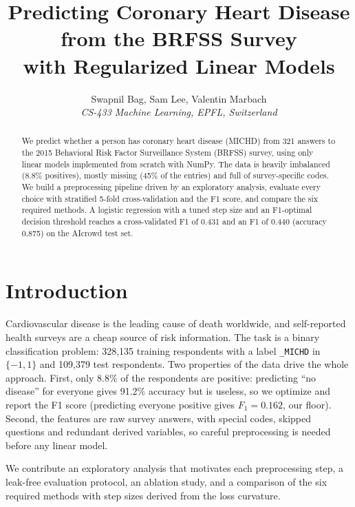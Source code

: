\documentclass[10pt,conference,compsocconf]{IEEEtran}
\begin{document}
\title{Predicting Coronary Heart Disease from the BRFSS Survey\\with Regularized Linear Models}

\author{
  Swapnil Bag, Sam Lee, Valentin Marbach\\
  \textit{CS-433 Machine Learning, EPFL, Switzerland}
}

\maketitle

\begin{abstract}
We predict whether a person has coronary heart disease (MICHD) from 321
answers to the 2015 Behavioral Risk Factor Surveillance System (BRFSS) survey,
using only linear models implemented from scratch with NumPy. The data is
heavily imbalanced (8.8\% positives), mostly missing (45\% of the entries) and
full of survey-specific codes. We build a preprocessing pipeline driven by an
exploratory analysis, evaluate every choice with stratified 5-fold
cross-validation and the F1 score, and compare the six required methods. A
logistic regression with a tuned step size and an F1-optimal decision
threshold reaches a cross-validated F1 of 0.431 and an F1 of 0.440 (accuracy
0.875) on the AIcrowd test set.
\end{abstract}

\section{Introduction}

Cardiovascular disease is the leading cause of death worldwide, and
self-reported health surveys are a cheap source of risk information. The task
is a binary classification problem: 328{,}135 training respondents with a
label \texttt{\_MICHD} in $\{-1,1\}$ and 109{,}379 test respondents. Two
properties of the data drive the whole approach. First, only 8.8\% of the
respondents are positive: predicting ``no disease'' for everyone gives 91.2\%
accuracy but is useless, so we optimize and report the F1 score (predicting
everyone positive gives $F_1 = 0.162$, our floor). Second, the features are raw
survey answers, with special codes, skipped questions and redundant derived
variables, so careful preprocessing is needed before any linear model.

We contribute an exploratory analysis that motivates each preprocessing
step, a leak-free evaluation protocol, an ablation study, and a comparison of
the six required methods with step sizes derived from the loss curvature.
\end{document}
